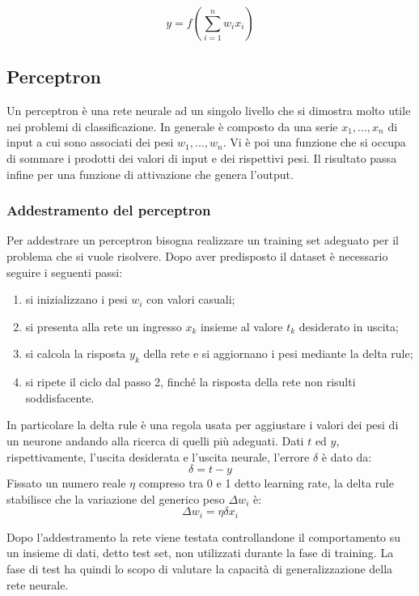 \documentclass[a4paper,11pt]{article}
\begin{document}
    $$y = f(\sum_{i=1}^{n}w_i x_i)$$

    \subsection{Perceptron}
    Un perceptron è una rete neurale ad un singolo livello che si dimostra molto utile nei problemi di classificazione.
    In generale è composto da una serie $x_1, ..., x_n$ di input a cui sono associati dei pesi $w_1, ..., w_n$. 
    Vi è poi una funzione che si occupa di sommare i prodotti dei valori di input e dei rispettivi pesi. 
    Il risultato passa infine per una funzione di attivazione che genera l'output.

    \newpage
    \subsubsection{Addestramento del perceptron}
    Per addestrare un perceptron bisogna realizzare un training set adeguato per il problema che si vuole risolvere. 
    Dopo aver predisposto il dataset è necessario seguire i seguenti passi:
    \begin{enumerate}
        \item si inizializzano i pesi $w_i$ con valori casuali;
        \item si presenta alla rete un ingresso $x_k$ insieme al valore $t_k$ desiderato in uscita;
        \item si calcola la risposta $y_k$ della rete e si aggiornano i pesi mediante la delta rule;
        \item si ripete il ciclo dal passo 2, finché la risposta della rete non risulti soddisfacente.
    \end{enumerate}

    In particolare la delta rule è una regola usata per aggiustare i valori dei pesi di un neurone andando alla ricerca di quelli più adeguati.
    Dati $t$ ed $y$, rispettivamente, l'uscita desiderata e l'uscita neurale, l'errore $\delta$ è dato da:
    $$ \delta = t-y $$
    Fissato un numero reale $\eta$ compreso tra 0 e 1 detto learning rate, la delta rule stabilisce che la variazione del generico peso $\Delta w_i$ è:
    $$ \Delta w_i = \eta \delta x_i $$

    Dopo l’addestramento la rete viene testata controllandone il comportamento su un insieme di dati, detto test set, non utilizzati durante la fase di training. La fase di test ha quindi lo scopo 
    di valutare la capacità di generalizzazione della rete neurale.
\end{document}
